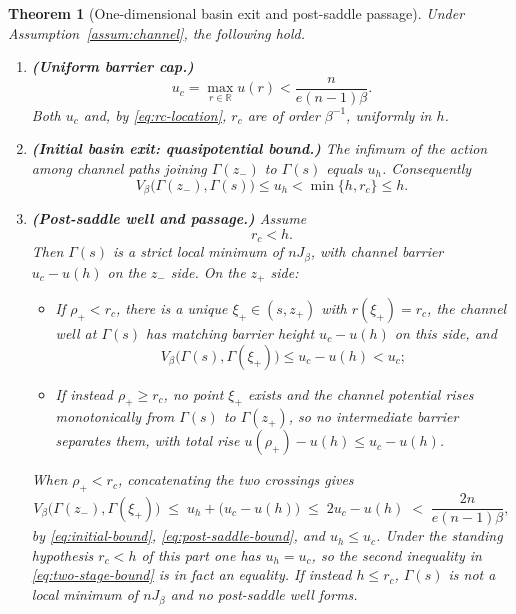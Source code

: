 \documentclass{article}
\theoremstyle{plain}
\newtheorem{theorem}{Theorem}[section]
\theoremstyle{definition}
\theoremstyle{remark}
\newcommand{\R}{\mathbb{R}}
\begin{document}
\begin{theorem}[One-dimensional basin exit and post-saddle passage]
\label{thm:transition-time}
Under Assumption~\ref{assum:channel}, the following hold.
\begin{enumerate}
    \item \textbf{(Uniform barrier cap.)}
    \begin{equation}
        u_c=\max_{r\in\R}u(r)<\frac{n}{e(n-1)\beta}.
        \label{eq:barrier-cap}
    \end{equation}
    Both $u_c$ and, by \eqref{eq:rc-location}, $r_c$ are of order $\beta^{-1}$, uniformly in $h$.

    \item \textbf{(Initial basin exit: quasipotential bound.)}
    The infimum of the action among channel paths joining $\Gamma(z_-)$ to $\Gamma(s)$ equals $u_h$. Consequently
    \begin{equation}
        V_\beta\bigl(\Gamma(z_-),\Gamma(s)\bigr)\le u_h<\min\{h,r_c\}\le h.
        \label{eq:initial-bound}
    \end{equation}

    \item \textbf{(Post-saddle well and passage.)}
    Assume
    \begin{equation}
        r_c<h.
        \label{eq:high-barrier-regime}
    \end{equation}
    Then $\Gamma(s)$ is a strict local minimum of $nJ_\beta$, with channel barrier $u_c-u(h)$ on the $z_-$ side. On the $z_+$ side:
    \begin{itemize}
        \item If $\rho_+<r_c$, there is a unique $\xi_+\in(s,z_+)$ with $r(\xi_+)=r_c$, the channel well at $\Gamma(s)$ has matching barrier height $u_c-u(h)$ on this side, and
        \begin{equation}
            V_\beta\bigl(\Gamma(s),\Gamma(\xi_+)\bigr)\le u_c-u(h)<u_c;
            \label{eq:post-saddle-bound}
        \end{equation}
        \item If instead $\rho_+\ge r_c$, no point $\xi_+$ exists and the channel potential rises monotonically from $\Gamma(s)$ to $\Gamma(z_+)$, so no intermediate barrier separates them, with total rise $u(\rho_+)-u(h)\le u_c-u(h)$.
    \end{itemize}
    When $\rho_+<r_c$, concatenating the two crossings gives
    \begin{equation}
        V_\beta\bigl(\Gamma(z_-),\Gamma(\xi_+)\bigr) \;\le\; u_h+\bigl(u_c-u(h)\bigr) \;\le\; 2u_c-u(h) \;<\; \frac{2n}{e(n-1)\beta},
        \label{eq:two-stage-bound}
    \end{equation}
    by \eqref{eq:initial-bound}, \eqref{eq:post-saddle-bound}, and $u_h\le u_c$. Under the standing hypothesis $r_c<h$ of this part one has $u_h=u_c$, so the second inequality in \eqref{eq:two-stage-bound} is in fact an equality.
    If instead $h\le r_c$, $\Gamma(s)$ is not a local minimum of $nJ_\beta$ and no post-saddle well forms.
\end{enumerate}
\end{theorem}
\end{document}
